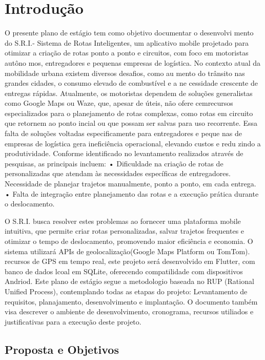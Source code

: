 \chapter{Introdução}\label{sec:1}

O presente plano de estágio tem como objetivo documentar o desenvolvi mento do S.R.I.- Sistema de Rotas Inteligentes, um aplicativo mobile projetado para otimizar a criação de rotas ponto a ponto e circuitos, com foco em motoristas autôno mos, entregadores e pequenas empresas de logística.
No contexto atual da mobilidade urbana existem diversos desafios, como au mento do trânsito nas grandes cidades, o consumo elevado de combustível e a ne cessidade crescente de entregas rápidas. Atualmente, os motoristas dependem de soluções generalistas como Google Maps ou Waze, que, apesar de úteis, não ofere cemrecursos especializados para o planejamento de rotas complexas, como rotas em circuito que retornem ao ponto incial ou que possam ser salvas para uso recorrente.
Essa falta de soluções voltadas especificamente para entregadores e peque nas de empresas de logística gera ineficiência operacional, elevando custos e redu zindo a produtividade. Conforme identificado no levantamento realizados através de pesquisas, as principais incluem:
• Dificuldade na criação de rotas de personalizadas que atendam às necessidades específicas de entregadores. Necessidade de planejar trajetos manualmente, ponto a ponto, em cada entrega.
• Falta de integração entre planejamento das rotas e a execução prática durante o deslocamento.

O S.R.I. busca resolver estes problemas ao fornecer uma plataforma mobile intuitiva, que permite criar rotas personalizadas, salvar trajetos frequentes e otimizar o tempo de deslocamento, promovendo maior eficiência e economia.
O sistema utilizará APIs de geolocalização(Google Maps Platform ou TomTom). recursos de GPS em tempo real, este projeto será desenvolvido em Flutter, com banco de dados lcoal em SQLite, oferecendo compatilidade com dispositivos Andriod.
Este plano de estágio segue a metodologio baseada no RUP (Rational Unified Process), contemplando todas as etapas do projeto: Levantamento de requisitos, planajamento, desenvolvimento e implantação. O documento também visa descrever o ambiente de desenvolvimento, cronograma, recursos utiliados e justificativas para a execução deste projeto.

\section{Proposta e Objetivos}

